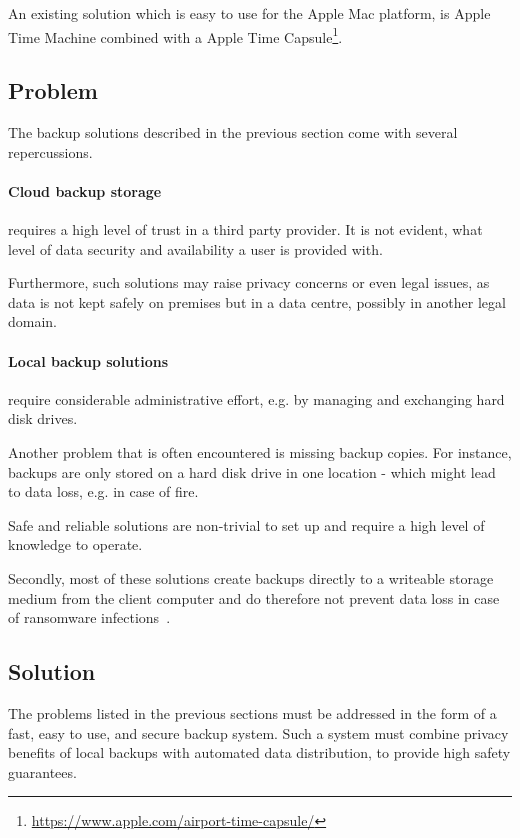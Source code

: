 An existing solution which is easy to use for the Apple Mac platform, is Apple Time Machine combined with a Apple Time Capsule\footnote{\url{https://www.apple.com/airport-time-capsule/}}.


\subsection{Problem}
The backup solutions described in the previous section come with several repercussions.

\paragraph{Cloud backup storage} requires a high level of trust in a third party provider. It is not evident, what level of data security and availability a user is provided with.

Furthermore, such solutions may raise privacy concerns or even legal issues, as data is not kept safely on premises but in a data centre, possibly in another legal domain.

\paragraph{Local backup solutions} require considerable administrative effort, e.g. by managing and exchanging hard disk drives.

Another problem that is often encountered is missing backup copies. For instance, backups are only stored on a hard disk drive in one location - which might lead to data loss, e.g. in case of fire.

Safe and reliable solutions are non-trivial to set up and require a high level of knowledge to operate.

Secondly, most of these solutions create backups directly to a writeable storage medium from the client computer and do therefore not prevent data loss in case of ransomware infections~\cite{young-cryptovirology}.

\subsection{Solution}

The problems listed in the previous sections must be addressed in the form of a fast, easy to use, and secure backup system. Such a system must combine privacy benefits of local backups with automated data distribution, to provide high safety guarantees.

